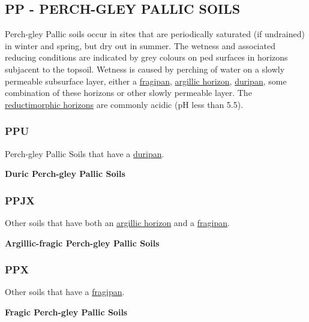 \documentclass[
  letterpaper,
  DIV=11,
  numbers=noendperiod]{scrreprt}
\begin{document}
\hypertarget{sec-PP}{%
\subsection{\texorpdfstring{\textbf{PP} - PERCH-GLEY PALLIC
SOILS}{PP - PERCH-GLEY PALLIC SOILS}}\label{sec-PP}}

Perch-gley Pallic soils occur in sites that are periodically saturated
(if undrained) in winter and spring, but dry out in summer. The wetness
and associated reducing conditions are indicated by grey colours on ped
surfaces in horizons subjacent to the topsoil. Wetness is caused by
perching of water on a slowly permeable subsurface layer, either a
\protect\hyperlink{sec-diag-fpan}{fragipan},
\protect\hyperlink{sec-diag-argh}{argillic horizon},
\protect\hyperlink{sec-diag-dpan}{duripan}, some combination of these
horizons or other slowly permeable layer. The
\protect\hyperlink{sec-diag-redmh}{reductimorphic horizons} are commonly
acidic (pH less than 5.5).

\hypertarget{sec-key-PPU}{%
\subsubsection{\texorpdfstring{\textbf{PPU}}{PPU}}\label{sec-key-PPU}}

Perch-gley Pallic Soils that have a
\protect\hyperlink{sec-diag-dpan}{duripan}.

\textbf{Duric Perch-gley Pallic Soils}

\hypertarget{sec-key-PPJX}{%
\subsubsection{\texorpdfstring{\textbf{PPJX}}{PPJX}}\label{sec-key-PPJX}}

Other soils that have both an \protect\hyperlink{sec-diag-argh}{argillic
horizon} and a \protect\hyperlink{sec-diag-fpan}{fragipan}.

\textbf{Argillic-fragic Perch-gley Pallic Soils}

\hypertarget{sec-key-PPX}{%
\subsubsection{\texorpdfstring{\textbf{PPX}}{PPX}}\label{sec-key-PPX}}

Other soils that have a \protect\hyperlink{sec-diag-fpan}{fragipan}.

\textbf{Fragic Perch-gley Pallic Soils}
\end{document}
